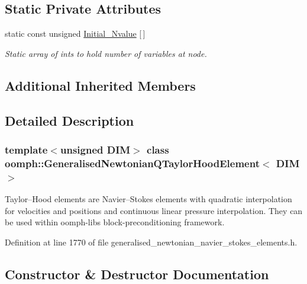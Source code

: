 \subsection*{Static Private Attributes}
\begin{DoxyCompactItemize}
\item 
static const unsigned \hyperlink{classoomph_1_1GeneralisedNewtonianQTaylorHoodElement_ae2922f62353eb629c7a18204657d057d}{Initial\+\_\+\+Nvalue} \mbox{[}$\,$\mbox{]}
\begin{DoxyCompactList}\small\item\em Static array of ints to hold number of variables at node. \end{DoxyCompactList}\end{DoxyCompactItemize}
\subsection*{Additional Inherited Members}


\subsection{Detailed Description}
\subsubsection*{template$<$unsigned D\+IM$>$\newline
class oomph\+::\+Generalised\+Newtonian\+Q\+Taylor\+Hood\+Element$<$ D\+I\+M $>$}

Taylor--Hood elements are Navier--Stokes elements with quadratic interpolation for velocities and positions and continuous linear pressure interpolation. They can be used within oomph-\/lib\textquotesingle{}s block-\/preconditioning framework. 

Definition at line 1770 of file generalised\+\_\+newtonian\+\_\+navier\+\_\+stokes\+\_\+elements.\+h.



\subsection{Constructor \& Destructor Documentation}
\mbox{\label{classoomph_1_1GeneralisedNewtonianQTaylorHoodElement_a0810ec28d1c3c7b43c9759df364f5d48}} 
